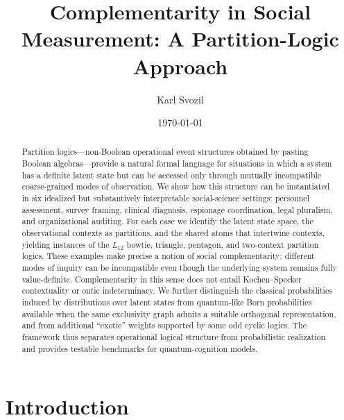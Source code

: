 \documentclass[aps,pra,twocolumn,superscriptaddress,floatfix,longbibliography]{revtex4-2}
\begin{document}
\title{Complementarity in Social Measurement: A Partition-Logic Approach}

\author{Karl Svozil }

\date{\today}

\begin{abstract}
Partition logics---non-Boolean operational event structures obtained by pasting Boolean algebras---provide a natural formal language for situations in which a system has a definite latent state but can be accessed only through mutually incompatible coarse-grained modes of observation. We show how this structure can be instantiated in six idealized but substantively interpretable social-science settings: personnel assessment, survey framing, clinical diagnosis, espionage coordination, legal pluralism, and organizational auditing. For each case we identify the latent state space, the observational contexts as partitions, and the shared atoms that intertwine contexts, yielding instances of the $L_{12}$ bowtie, triangle, pentagon, and two-context partition logics. These examples make precise a notion of social complementarity: different modes of inquiry can be incompatible even though the underlying system remains fully value-definite. Complementarity in this sense does not entail Kochen--Specker contextuality or ontic indeterminacy. We further distinguish the classical probabilities induced by distributions over latent states from quantum-like Born probabilities available when the same exclusivity graph admits a suitable orthogonal representation, and from additional ``exotic'' weights supported by some odd cyclic logics. The framework thus separates operational logical structure from probabilistic realization and provides testable benchmarks for quantum-cognition models.
\end{abstract}

\maketitle

\section{Introduction}
\label{sec:intro}
\end{document}

